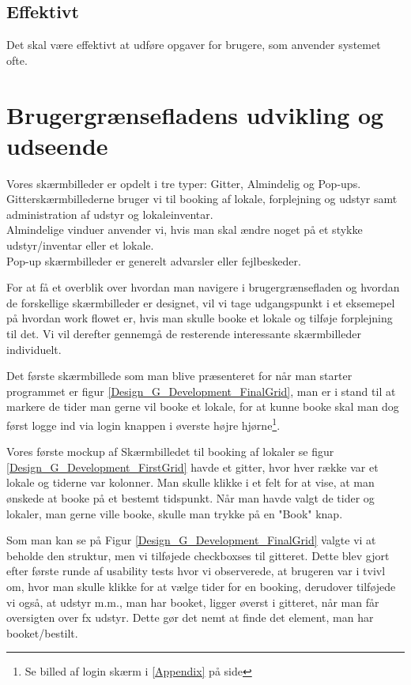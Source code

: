 \subsection{Effektivt}
Det skal være effektivt at udføre opgaver for brugere, som anvender systemet ofte.

\section{Brugergrænsefladens udvikling og udseende}
\label{Design_G_Development}
Vores skærmbilleder er opdelt i tre typer: Gitter, Almindelig og Pop-ups. 
\\Gitterskærmbillederne bruger vi til booking af lokale, forplejning og udstyr samt administration af udstyr og lokaleinventar.
\\Almindelige vinduer anvender vi, hvis man skal ændre noget på et stykke udstyr/inventar eller et lokale.
\\Pop-up skærmbilleder er generelt advarsler eller fejlbeskeder.

For at få et overblik over hvordan man navigere i brugergrænsefladen og hvordan de forskellige skærmbilleder er designet, vil vi tage udgangspunkt i et eksemepel på hvordan work flowet er, hvis man skulle booke et lokale og tilføje forplejning til det. Vi vil derefter gennemgå de resterende interessante skærmbilleder individuelt.

Det første skærmbillede som man blive præsenteret for når man starter programmet er figur \ref{Design_G_Development_FinalGrid}, man er i stand til at markere de tider man gerne vil booke et lokale, for at kunne booke skal man dog først logge ind via login knappen i øverste højre hjørne\footnote{Se billed af login skærm i \ref{Appendix} på side \pageref{Appendix}}. 

Vores første mockup af Skærmbilledet til booking af lokaler se figur \ref{Design_G_Development_FirstGrid} havde et gitter, hvor hver række var et lokale og tiderne var kolonner. Man skulle klikke i et felt for at vise, at man ønskede at booke på et bestemt tidspunkt. Når man havde valgt de tider og lokaler, man gerne ville booke, skulle man trykke på en "Book" knap. 

Som man kan se på Figur \ref{Design_G_Development_FinalGrid} valgte vi at beholde den struktur, men vi tilføjede checkboxses til gitteret. Dette blev gjort efter første runde af usability tests hvor vi observerede, at brugeren var i tvivl om, hvor man skulle klikke for at vælge tider for en booking, derudover tilføjede vi også, at udstyr m.m., man har booket, ligger øverst i gitteret, når man får oversigten over fx udstyr. Dette gør det nemt at finde det element, man har booket/bestilt.

